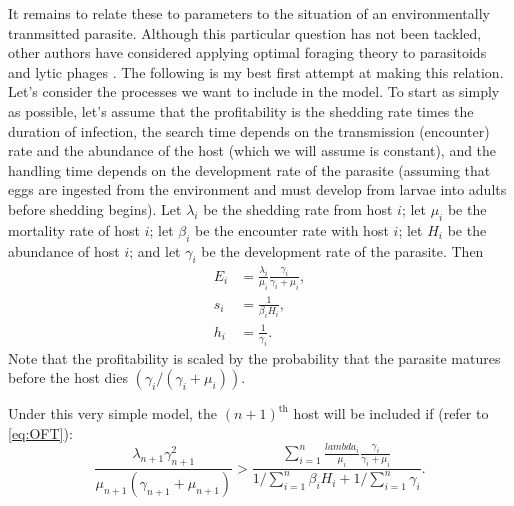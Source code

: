 \documentclass[11pt,reqno,final,pdftex]{amsart}\usepackage[]{graphicx}\usepackage[]{color}
\theoremstyle{plain}
\numberwithin{equation}{part}
\begin{document}
It remains to relate these to parameters to the situation of an environmentally tranmsitted parasite.
Although this particular question has not been tackled, other authors have considered applying optimal foraging theory to parasitoids \citep{Iwasa1984,Charnov1988} and lytic phages \citep{Guyader2008}.
The following is my best first attempt at making this relation.
Let's consider the processes we want to include in the model.
To start as simply as possible, let's assume that the profitability is the shedding rate times the duration of infection, the search time depends on the transmission (encounter) rate and the abundance of the host (which we will assume is constant), and the handling time depends on the development rate of the parasite (assuming that eggs are ingested from the environment and must develop from larvae into adults before shedding begins).
Let $\lambda_i$ be the shedding rate from host $i$; let $\mu_i$ be the mortality rate of host $i$; let $\beta_i$ be the encounter rate with host $i$; let $H_i$ be the abundance of host $i$; and let $\gamma_i$ be the development rate of the parasite.
Then
\begin{align}
E_i &= \frac{\lambda_i}{\mu_i}\frac{\gamma_i}{\gamma_i+\mu_i}, \\
s_i &= \frac{1}{\beta_i H_i}, \\
h_i &= \frac{1}{\gamma_i}.
\end{align}
Note that the profitability is scaled by the probability that the parasite matures before the host dies $(\gamma_i/(\gamma_i+\mu_i))$.

Under this very simple model, the $(n+1)^{\text{th}}$ host will be included if (refer to \ref{eq:OFT}):
\begin{equation}
\frac{\lambda_{n+1} \gamma_{n+1}^2}{\mu_{n+1} (\gamma_{n+1}+\mu_{n+1})} > \frac{\sum_{i=1}^n \frac{lambda_i}{\mu_i}\frac{\gamma_i}{\gamma_i+\mu_i}}{1/\sum_{i=1}^n \beta_i H_i + 1/\sum_{i=1}^n \gamma_i}.
\end{equation}
\end{document}
